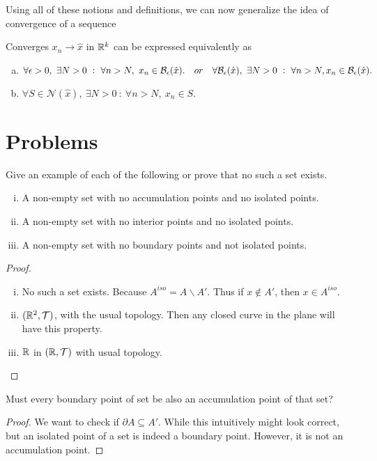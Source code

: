 Using all of these notions and definitions, we can now generalize the idea of convergence of a sequence
\begin{proposition}
	Converges $x_n \to \hat{x}$ in $\mathbb{R}^k$ can be expressed equivalently as 
	\begin{enumerate}[(a)]
		\item $\forall \epsilon>0,\ \exists N>0\ :\ \forall n>N,\ x_n \in \mathcal{B}_{\epsilon}(\hat{x}). \quad or \quad \forall \mathcal{B}_{\epsilon}(\hat{x}),\ \exists N>0\ :\ \forall n>N, x_n \in \mathcal{B}_{\epsilon}(\hat{x}). $
		\item $\forall S \in \mathcal{N}(\hat{x}),\ \exists N>0\ :\ \forall n>N,\ x_n \in S.$
	\end{enumerate}
\end{proposition}


\section{Problems}

\begin{problem}
	Give an example of each of the following or prove that no such a set exists.
	\begin{enumerate}[(i)]
		\item A non-empty set with no accumulation points and no isolated points.
		\item A non-empty set with no interior points and no isolated points.
		\item A non-empty set with no boundary points and not isolated points.
	\end{enumerate}
\end{problem}
\begin{proof}
	~\vspace{2pt}
	\begin{enumerate}[(i)]
		\item No such a set exists. Because $A^{iso} = A \backslash A'$. Thus if $x\notin A'$, then $x \in A^{iso}$.
		\item $(\mathbb{R}^2,\mathcal{T})$, with the usual topology. Then any closed curve in the plane will have this property.
		\item $\mathbb{R}$ in $(\mathbb{R},\mathcal{T})$ with usual topology.
	\end{enumerate}
\end{proof}


\begin{problem}
	Must every boundary point of set be also an accumulation point of that set?
\end{problem}
\begin{proof}
	We want to check if $\partial A \subseteq A'$. While this intuitively might look correct, but an isolated point of a set is indeed a boundary point. However, it is not an accumulation point. 
\end{proof}

